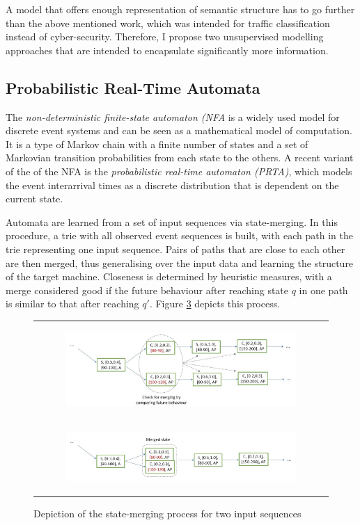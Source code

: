 \documentclass[a4paper,12pt,twoside]{report}
\begin{document}
A model that offers enough representation of semantic structure has to go further than the above mentioned work, which was intended for traffic classification instead of cyber-security. Therefore, I propose two unsupervised modelling approaches that are intended to encapsulate significantly more information.

\subsection{Probabilistic Real-Time Automata}\label{PRTA}

The \textit{non-deterministic finite-state automaton (NFA} is a widely used model for discrete event systems and can be seen as a mathematical model of computation. It is a type of Markov chain with a finite number of states and a set of Markovian transition probabilities from each state to the others. A recent variant of the  of the NFA is the \textit{probabilistic real-time automaton (PRTA)}, which models the event interarrival times as a discrete distribution that is dependent on the current state. 

Automata are learned from a set of input sequences via state-merging. In this procedure, a trie with all observed event sequences is built, with each path in the trie representing one input sequence. Pairs of paths that are close to each other are then merged, thus generalising over the input data and learning the structure of the target machine. Closeness is determined by heuristic measures, with a merge  considered good if the future behaviour after  reaching state $q$ in one path is  similar to that after reaching $q\prime$. Figure \ref{Autt} depicts this process.


\begin{figure}[h]
\centering
\begin{tabular}{c}
\begin{subfigure}[b]{0.85\textwidth}\label{Autotrie}
\includegraphics[width=\textwidth]{images/Autotrie.jpg}
\caption{}
\end{subfigure}\\
\begin{subfigure}[b]{0.85\textwidth}\label{Automerge}
\includegraphics[width=\textwidth]{images/Automerge.jpg}
\caption{}
\end{subfigure}
\end{tabular}
\caption{Depiction of the state-merging process for two input sequences}\label{Autt}
\end{figure}
\end{document}
